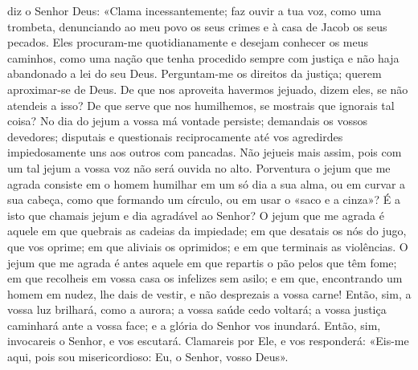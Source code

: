 \begin{paracol}{2}
{ diz o Senhor Deus: «Clama incessantemente; faz ouvir a tua voz, como uma trombeta, denunciando ao meu povo os seus crimes e à casa de Jacob os seus pecados. Eles procuram-me quotidianamente e desejam conhecer os meus caminhos, como uma nação que tenha procedido sempre com justiça e não haja abandonado a lei do seu Deus. Perguntam-me os direitos da justiça; querem aproximar-se de Deus. De que nos aproveita havermos jejuado, dizem eles, se não atendeis a isso? De que serve que nos humilhemos, se mostrais que ignorais tal coisa? No dia do jejum a vossa má vontade persiste; demandais os vossos devedores; disputais e questionais reciprocamente até vos agredirdes impiedosamente uns aos outros com pancadas. Não jejueis mais assim, pois com um tal jejum a vossa voz não será ouvida no alto. Porventura o jejum que me agrada consiste em o homem humilhar em um só dia a sua alma, ou em curvar a sua cabeça, como que formando um círculo, ou em usar o «saco e a cinza»? É a isto que chamais jejum e dia agradável ao Senhor? O jejum que me agrada é aquele em que quebrais as cadeias da impiedade; em que desatais os nós do jugo, que vos oprime; em que aliviais os oprimidos; e em que terminais as violências. O jejum que me agrada é antes aquele em que repartis o pão pelos que têm fome; em que recolheis em vossa casa os infelizes sem asilo; e em que, encontrando um homem em nudez, lhe dais de vestir, e não desprezais a vossa carne! Então, sim, a vossa luz brilhará, como a aurora; a vossa saúde cedo voltará; a vossa justiça caminhará ante a vossa face; e a glória do Senhor vos inundará. Então, sim, invocareis o Senhor, e vos escutará. Clamareis por Ele, e vos responderá: «Eis-me aqui, pois sou misericordioso: Eu, o Senhor, vosso Deus».
}\end{paracol}

\begin{paracol}{2}\switchcolumn{}\end{paracol}


